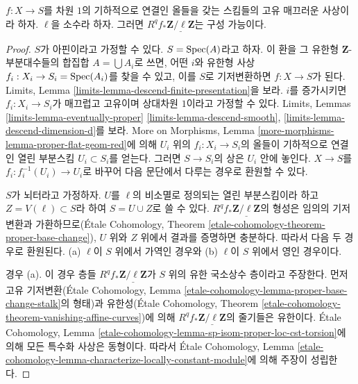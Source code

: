 \begin{lemma}
\label{lemma-proper-smooth-family-curves}
$f : X \to S$를 차원 $1$의 기하적으로 연결인 올들을 갖는 스킴들의
고유 매끄러운 사상이라 하자. $\ell$을 소수라 하자. 그러면
$R^qf_*\underline{\mathbf{Z}/\ell\mathbf{Z}}$는 구성 가능이다.
\end{lemma}

\begin{proof}
$S$가 아핀이라고 가정할 수 있다. $S = \mathop{\mathrm{Spec}}(A)$라고 하자.
이 환을 그 유한형 $\mathbf{Z}$-부분대수들의 합집합
$A = \bigcup A_i$로 쓰면, 어떤 $i$와 유한형 사상
$f_i : X_i \to S_i = \mathop{\mathrm{Spec}}(A_i)$를 찾을 수 있고, 이를 $S$로
기저변환하면 $f : X \to S$가 된다. Limits, Lemma
\ref{limits-lemma-descend-finite-presentation}을 보라.
$i$를 증가시키면 $f_i : X_i \to S_i$가 매끄럽고 고유이며
상대차원 $1$이라고 가정할 수 있다. Limits, Lemmas
\ref{limits-lemma-eventually-proper}
\ref{limits-lemma-descend-smooth},
\ref{limits-lemma-descend-dimension-d}를 보라.
More on Morphisms, Lemma
\ref{more-morphisms-lemma-proper-flat-geom-red}에 의해
$U_i$ 위의 $f_i : X_i \to S_i$의 올들이 기하적으로 연결인 열린
부분스킴 $U_i \subset S_i$를 얻는다. 그러면 $S \to S_i$의 상은
$U_i$ 안에 놓인다. $X \to S$를
$f_i : f_i^{-1}(U_i) \to U_i$로 바꾸어 다음 문단에서 다루는 경우로
환원할 수 있다.

\medskip\noindent
$S$가 뇌터라고 가정하자. $U$를 $\ell$의 비소멸로 정의되는 열린
부분스킴이라 하고 $Z = V(\ell) \subset S$라 하여 $S = U \cup Z$로
쓸 수 있다. $R^qf_*\underline{\mathbf{Z}/\ell\mathbf{Z}}$의 형성은
임의의 기저변환과 가환하므로(\'Etale Cohomology, Theorem
\ref{etale-cohomology-theorem-proper-base-change}),
$U$ 위와 $Z$ 위에서 결과를 증명하면 충분하다. 따라서 다음 두 경우로
환원된다. (a) $\ell$이 $S$ 위에서 가역인 경우와
(b) $\ell$이 $S$ 위에서 영인 경우이다.

\medskip\noindent
경우 (a). 이 경우 층들
$R^qf_*\underline{\mathbf{Z}/\ell\mathbf{Z}}$가 $S$ 위의 유한 국소상수
층이라고 주장한다. 먼저 고유 기저변환(\'Etale Cohomology, Lemma
\ref{etale-cohomology-lemma-proper-base-change-stalk}의 형태)과
유한성(\'Etale Cohomology, Theorem
\ref{etale-cohomology-theorem-vanishing-affine-curves})에 의해
$R^qf_*\underline{\mathbf{Z}/\ell\mathbf{Z}}$의 줄기들은 유한이다.
\'Etale Cohomology, Lemma
\ref{etale-cohomology-lemma-sp-isom-proper-loc-cst-torsion}에 의해
모든 특수화 사상은 동형이다. 따라서 \'Etale Cohomology, Lemma
\ref{etale-cohomology-lemma-characterize-locally-constant-module}에
의해 주장이 성립한다.


\end{proof}
